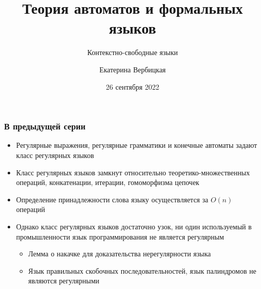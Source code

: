 \documentclass{beamer}
\title[]{Теория автоматов и формальных языков}
\subtitle[]{Контекстно-свободные языки}
\institute[]{
НИУ-ВШЭ\\
}
\author[]{Екатерина Вербицкая}
\date{26 сентября 2022}
\begin{document}
{
  \begin{frame}
    \titlepage
  \end{frame}
}


\begin{frame}[fragile]
  \transwipe[direction=90]
  \frametitle{В предыдущей серии}
  \begin{itemize}
    \item Регулярные выражения, регулярные грамматики и конечные автоматы задают класс регулярных языков
    \item Класс регулярных языков замкнут относительно теоретико-множественных операций, конкатенации, итерации, гомоморфизма цепочек
    \item Определение принадлежности слова языку осуществляется за $O(n)$ операций
    \item Однако класс регулярных языков достаточно узок, ни один используемый в промышленности язык программирования не является регулярным
    \begin{itemize}
      \item Лемма о накачке для доказательства нерегулярности языка
      \item Язык правильных скобочных последовательностей, язык палиндромов не являются регулярными
    \end{itemize}
  \end{itemize}
\end{frame}
\end{document}
